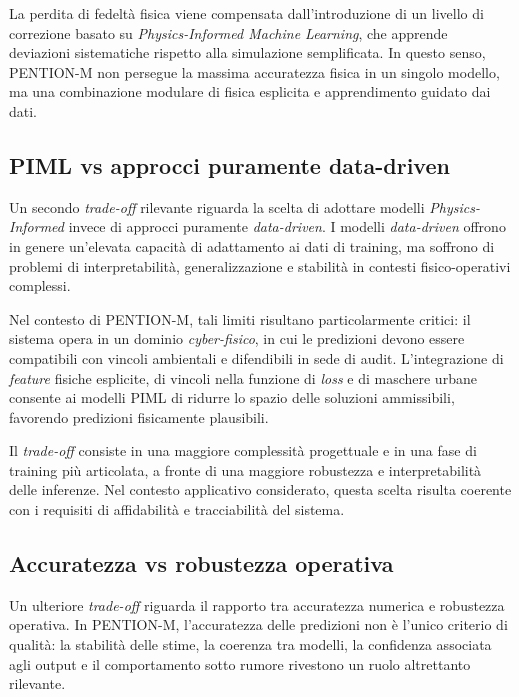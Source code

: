 La perdita di fedeltà fisica viene compensata dall’introduzione di un livello di correzione basato su \emph{Physics-Informed Machine Learning}, che apprende deviazioni sistematiche rispetto alla simulazione semplificata.
In questo senso, \textsc{PENTION-M} non persegue la massima accuratezza fisica in un singolo modello, ma una combinazione modulare di fisica esplicita e apprendimento guidato dai dati.

\subsection{PIML vs approcci puramente data-driven}

Un secondo \textit{trade-off} rilevante riguarda la scelta di adottare modelli \emph{Physics-Informed} invece di approcci puramente \textit{data-driven}.
I modelli \textit{data-driven} offrono in genere un’elevata capacità di adattamento ai dati di training, ma soffrono di problemi di interpretabilità, generalizzazione e stabilità in contesti fisico-operativi complessi.

Nel contesto di \textsc{PENTION-M}, tali limiti risultano particolarmente critici: il sistema opera in un dominio \textit{cyber-fisico}, in cui le predizioni devono essere compatibili con vincoli ambientali e difendibili in sede di audit.
L’integrazione di \textit{feature} fisiche esplicite, di vincoli nella funzione di \textit{loss} e di maschere urbane consente ai modelli PIML di ridurre lo spazio delle soluzioni ammissibili, favorendo predizioni fisicamente plausibili.

Il \textit{trade-off} consiste in una maggiore complessità progettuale e in una fase di training più articolata, a fronte di una maggiore robustezza e interpretabilità delle inferenze.
Nel contesto applicativo considerato, questa scelta risulta coerente con i requisiti di affidabilità e tracciabilità del sistema.

\subsection{Accuratezza vs robustezza operativa}

Un ulteriore \textit{trade-off} riguarda il rapporto tra accuratezza numerica e robustezza operativa.
In \textsc{PENTION-M}, l’accuratezza delle predizioni non è l’unico criterio di qualità: la stabilità delle stime, la coerenza tra modelli, la confidenza associata agli output e il comportamento sotto rumore rivestono un ruolo altrettanto rilevante.

